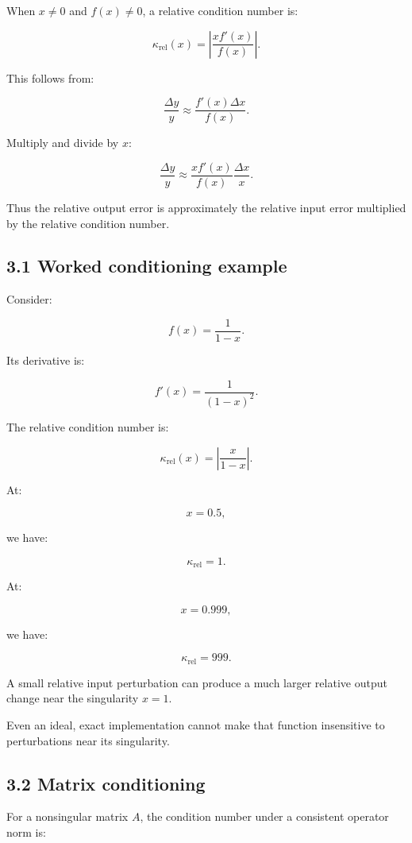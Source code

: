 When \(x\ne0\) and \(f(x)\ne0\), a relative condition number is:

\[ \boxed{ \kappa_{\mathrm{rel}}(x) = \left| \frac{xf'(x)}{f(x)} \right| }. \]

This follows from:

\[ \frac{\Delta y}{y} \approx \frac{f'(x)\Delta x}{f(x)}. \]

Multiply and divide by \(x\):

\[ \frac{\Delta y}{y} \approx \frac{xf'(x)}{f(x)} \frac{\Delta x}{x}. \]

Thus the relative output error is approximately the relative input error multiplied by the relative condition number.

\subsection{3.1 Worked conditioning example}\label{02-foundations-ii-ch028-worked-conditioning-example}

Consider:

\[ f(x)=\frac1{1-x}. \]

Its derivative is:

\[ f'(x)=\frac1{(1-x)^2}. \]

The relative condition number is:

\[ \kappa_{\mathrm{rel}}(x) = \left| \frac{x}{1-x} \right|. \]

At:

\[ x=0.5, \]

we have:

\[ \kappa_{\mathrm{rel}}=1. \]

At:

\[ x=0.999, \]

we have:

\[ \boxed{\kappa_{\mathrm{rel}}=999}. \]

A small relative input perturbation can produce a much larger relative output change near the singularity \(x=1\).

Even an ideal, exact implementation cannot make that function insensitive to perturbations near its singularity.

\subsection{3.2 Matrix conditioning}\label{02-foundations-ii-ch028-matrix-conditioning}

For a nonsingular matrix \(A\), the condition number under a consistent operator norm is:

